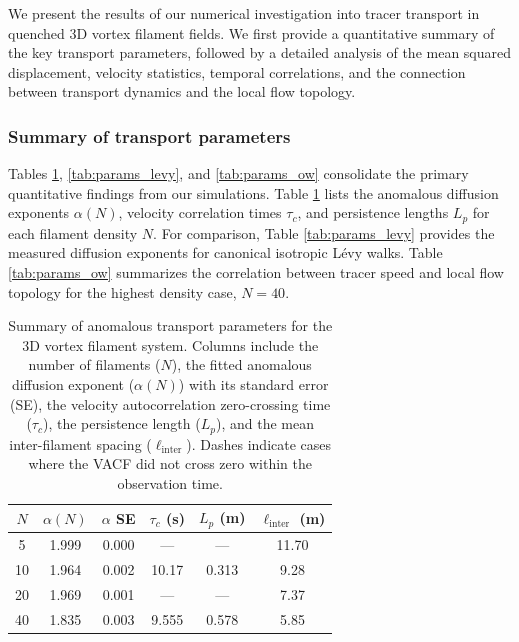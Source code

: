 \documentclass[]{article}
\begin{document}
We present the results of our numerical investigation into tracer transport in quenched 3D vortex filament fields. We first provide a quantitative summary of the key transport parameters, followed by a detailed analysis of the mean squared displacement, velocity statistics, temporal correlations, and the connection between transport dynamics and the local flow topology.

\subsubsection{Summary of transport parameters}

Tables \ref{tab:params_vortex}, \ref{tab:params_levy}, and \ref{tab:params_ow} consolidate the primary quantitative findings from our simulations. Table \ref{tab:params_vortex} lists the anomalous diffusion exponents $\alpha(N)$, velocity correlation times $\tau_c$, and persistence lengths $L_p$ for each filament density $N$. For comparison, Table \ref{tab:params_levy} provides the measured diffusion exponents for canonical isotropic L\'evy walks. Table \ref{tab:params_ow} summarizes the correlation between tracer speed and local flow topology for the highest density case, $N=40$.

\begin{table}[h!]
\centering
\caption{Summary of anomalous transport parameters for the 3D vortex filament system. Columns include the number of filaments ($N$), the fitted anomalous diffusion exponent ($\alpha(N)$) with its standard error (SE), the velocity autocorrelation zero-crossing time ($\tau_c$), the persistence length ($L_p$), and the mean inter-filament spacing ($\ell_{\text{inter}}$). Dashes indicate cases where the VACF did not cross zero within the observation time.}
\label{tab:params_vortex}
\begin{tabular}{cccccc}
\hline
$N$ & $\alpha(N)$ & $\alpha$ SE & $\tau_c$ (s) & $L_p$ (m) & $\ell_{\text{inter}}$ (m) \\
\hline
5  & 1.999 & 0.000 & —     & —     & 11.70 \\
10 & 1.964 & 0.002 & 10.17 & 0.313 & 9.28  \\
20 & 1.969 & 0.001 & —     & —     & 7.37  \\
40 & 1.835 & 0.003 & 9.555 & 0.578 & 5.85  \\
\hline
\end{tabular}
\end{table}
\end{document}
